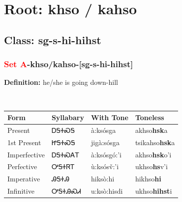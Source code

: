 \needspace{4in}
\section*{Root: khso / kahso}
\nopagebreak
{}
\needspace{3in}
\subsection*{Class: sg-s-hi-hihst}
\nopagebreak
\needspace{2in}
\subsubsection*{\textcolor{Red}{Set A}{-}\textbf{khso/kahso}{-}[sg-s-hi-hihst]}
\nopagebreak
\textbf{Definition: } he/she is going down-hill
\\[0.5em]
\begin{tabularx}{\textwidth}{l X X X}%
\toprule%
\textbf{Form}&\textbf{Syllabary}&\textbf{With Tone}&\textbf{Toneless}\\%
\midrule%
Present&ᎠᎦᏐᏍᎦ&à:ksósga&akhso\textbf{hsk}a\\%
1st Present&ᏥᎦᏐᏍᎦ&jigà:sósga&tsikahso\textbf{hsk}a\\%
Imperfective&ᎠᎦᏐᏍᎪᎢ&à:ksósgó:’i&akhso\textbf{hsk}o'i\\%
Perfective&ᎤᎦᏐᏒᎢ&ù:ksósv̌:’i&ukhso\textbf{hs}v'i\\%
Imperative&ᎯᎦᏐᎯ&hiksò:hi&hikhso\textbf{hi}\\%
Infinitive&ᎤᎦᏐᎯᏍᏗ&u:ksò:hisdi&ukhso\textbf{hihst}i\\%
\bottomrule%
\end{tabularx}
\\[1em]